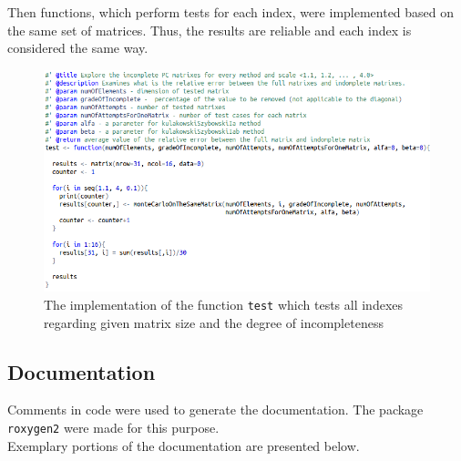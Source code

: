 Then functions, which perform tests for each index, were implemented based on the same set of matrices. Thus, the results are reliable and each index is considered the same way.

\begin{figure}[!]
\centerline{\includegraphics[scale=0.58]{images/kod22.png}}
\caption{The implementation of the function \texttt{test} which tests all indexes regarding given matrix size and the degree of incompleteness}
\label{fig:rstudio}
\end{figure}


\subsection{Documentation}
Comments in code were used to generate the documentation. The package \texttt{roxygen2} were made for this purpose. \\ Exemplary portions of the documentation are presented below.

